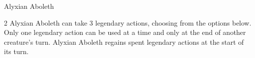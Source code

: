 \documentclass[10pt,a4paper,twoside,bg=print,twocolumn,openany,nodeprecatedcode]{dndbook}
\begin{document}
\begin{DndMonster}[float*=b,width=\textwidth + 8pt]{Alyxian Aboleth}
\begin{multicols}{2}
Alyxian Aboleth can take 3 legendary actions, choosing from the options below. Only one legendary action can be used at a time and only at the end of another creature's turn. Alyxian Aboleth regains spent legendary actions at the start of its turn.

\begin{DndMonsterLegendaryActions}
\end{DndMonsterLegendaryActions}
\end{multicols}
\end{DndMonster}
\end{document}
